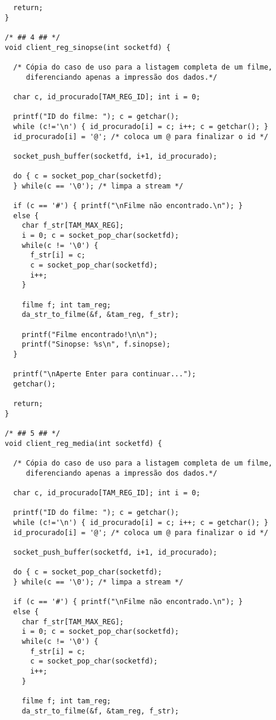 \documentclass[11pt,twoside]{article}
\begin{document}
\begin{verbatim}
  return;
}

/* ## 4 ## */
void client_reg_sinopse(int socketfd) {

  /* Cópia do caso de uso para a listagem completa de um filme, 
     diferenciando apenas a impressão dos dados.*/
  
  char c, id_procurado[TAM_REG_ID]; int i = 0;

  printf("ID do filme: "); c = getchar();
  while (c!='\n') { id_procurado[i] = c; i++; c = getchar(); }
  id_procurado[i] = '@'; /* coloca um @ para finalizar o id */

  socket_push_buffer(socketfd, i+1, id_procurado);

  do { c = socket_pop_char(socketfd);
  } while(c == '\0'); /* limpa a stream */
  
  if (c == '#') { printf("\nFilme não encontrado.\n"); }
  else {
    char f_str[TAM_MAX_REG];
    i = 0; c = socket_pop_char(socketfd);
    while(c != '\0') { 
      f_str[i] = c; 
      c = socket_pop_char(socketfd);
      i++;
    }

    filme f; int tam_reg;
    da_str_to_filme(&f, &tam_reg, f_str);

    printf("Filme encontrado!\n\n");
    printf("Sinopse: %s\n", f.sinopse);
  }

  printf("\nAperte Enter para continuar...");
  getchar();

  return;
}

/* ## 5 ## */
void client_reg_media(int socketfd) {

  /* Cópia do caso de uso para a listagem completa de um filme, 
     diferenciando apenas a impressão dos dados.*/

  char c, id_procurado[TAM_REG_ID]; int i = 0;

  printf("ID do filme: "); c = getchar();
  while (c!='\n') { id_procurado[i] = c; i++; c = getchar(); }
  id_procurado[i] = '@'; /* coloca um @ para finalizar o id */

  socket_push_buffer(socketfd, i+1, id_procurado);

  do { c = socket_pop_char(socketfd);
  } while(c == '\0'); /* limpa a stream */
  
  if (c == '#') { printf("\nFilme não encontrado.\n"); }
  else {
    char f_str[TAM_MAX_REG];
    i = 0; c = socket_pop_char(socketfd);
    while(c != '\0') { 
      f_str[i] = c; 
      c = socket_pop_char(socketfd);
      i++;
    }

    filme f; int tam_reg;
    da_str_to_filme(&f, &tam_reg, f_str);


\end{verbatim}
\end{document}
